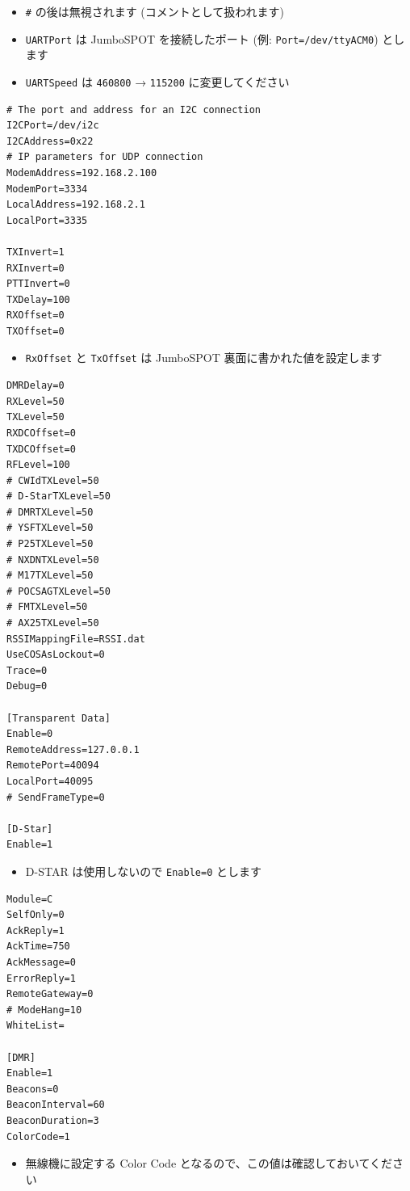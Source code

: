 \documentclass[a4j,oneside]{ujbook}
\begin{document}
\begin{itemize}
 \renewcommand{\labelitemi}{$\triangleright$}
 \item \verb+#+ の後は無視されます (コメントとして扱われます)
 \item \verb+UARTPort+ は JumboSPOT を接続したポート (例: \verb+Port=/dev/ttyACM0+) とします
 \item \verb+UARTSpeed+ は \verb+460800+ → \verb+115200+ に変更してください
\end{itemize}
\begin{verbatim}
# The port and address for an I2C connection
I2CPort=/dev/i2c
I2CAddress=0x22
# IP parameters for UDP connection
ModemAddress=192.168.2.100
ModemPort=3334
LocalAddress=192.168.2.1
LocalPort=3335

TXInvert=1
RXInvert=0
PTTInvert=0
TXDelay=100
RXOffset=0
TXOffset=0
\end{verbatim}
\begin{itemize}
 \renewcommand{\labelitemi}{$\triangleright$}
 \item \verb+RxOffset+ と \verb+TxOffset+ は JumboSPOT 裏面に書かれた値を設定します
\end{itemize}
\begin{verbatim}
DMRDelay=0
RXLevel=50
TXLevel=50
RXDCOffset=0
TXDCOffset=0
RFLevel=100
# CWIdTXLevel=50
# D-StarTXLevel=50
# DMRTXLevel=50
# YSFTXLevel=50
# P25TXLevel=50
# NXDNTXLevel=50
# M17TXLevel=50
# POCSAGTXLevel=50
# FMTXLevel=50
# AX25TXLevel=50
RSSIMappingFile=RSSI.dat
UseCOSAsLockout=0
Trace=0
Debug=0

[Transparent Data]
Enable=0
RemoteAddress=127.0.0.1
RemotePort=40094
LocalPort=40095
# SendFrameType=0

[D-Star]
Enable=1
\end{verbatim}
\begin{itemize}
 \renewcommand{\labelitemi}{$\triangleright$}
 \item D-STAR は使用しないので \verb+Enable=0+ とします
\end{itemize}
\begin{verbatim}
Module=C
SelfOnly=0
AckReply=1
AckTime=750
AckMessage=0
ErrorReply=1
RemoteGateway=0
# ModeHang=10
WhiteList=

[DMR]
Enable=1
Beacons=0
BeaconInterval=60
BeaconDuration=3
ColorCode=1
\end{verbatim}
\begin{itemize}
 \renewcommand{\labelitemi}{$\triangleright$}
 \item 無線機に設定する Color Code となるので、この値は確認しておいてください
\end{itemize}
\end{document}
